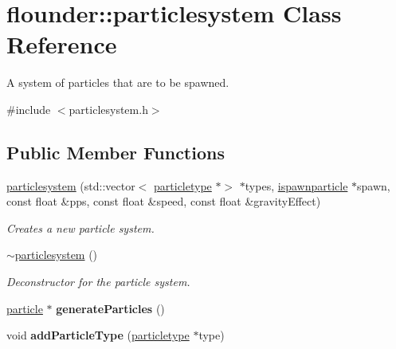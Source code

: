 \hypertarget{classflounder_1_1particlesystem}{}\section{flounder\+:\+:particlesystem Class Reference}
\label{classflounder_1_1particlesystem}


A system of particles that are to be spawned.  




{\ttfamily \#include $<$particlesystem.\+h$>$}

\subsection*{Public Member Functions}
\begin{DoxyCompactItemize}
\item 
\hyperlink{classflounder_1_1particlesystem_a107ab162ea1911ffd55a0cf06df031e1}{particlesystem} (std\+::vector$<$ \hyperlink{classflounder_1_1particletype}{particletype} $\ast$$>$ $\ast$types, \hyperlink{classflounder_1_1ispawnparticle}{ispawnparticle} $\ast$spawn, const float \&pps, const float \&speed, const float \&gravity\+Effect)
\begin{DoxyCompactList}\small\item\em Creates a new particle system. \end{DoxyCompactList}\item 
\hyperlink{classflounder_1_1particlesystem_a723351ea51893f2d95bb585dbd1112ca}{$\sim$particlesystem} ()
\begin{DoxyCompactList}\small\item\em Deconstructor for the particle system. \end{DoxyCompactList}\item 
\mbox{\label{classflounder_1_1particlesystem_a153ef3670026addab7ae785f524dccae}} 
\hyperlink{classflounder_1_1particle}{particle} $\ast$ {\bfseries generate\+Particles} ()
\item 
\mbox{\label{classflounder_1_1particlesystem_a141e4aa7ab163240d0964857e81a0da3}} 
void {\bfseries add\+Particle\+Type} (\hyperlink{classflounder_1_1particletype}{particletype} $\ast$type)
\item 
\mbox{\label{classflounder_1_1particlesystem_a1c0a6ae90fd8886b7a0fa1d82bb88a88}} 
$$
\end{DoxyCompactItemize}
